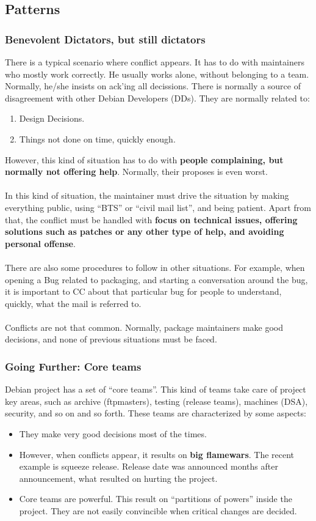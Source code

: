 \documentclass[11pt]{article}
\begin{document}
\subsection{Patterns}
\subsubsection{Benevolent Dictators, but still dictators}
There is a typical scenario where conflict appears. It has to do with maintainers who mostly work correctly. He usually works alone, without belonging to a team. Normally, he/she insists on ack'ing all decissions. There is normally a source of disagreement with other Debian Developers (DDs). They are normally related to:
\begin{enumerate}\itemsep0pt
\item{Design Decisions}.
\item{Things not done on time, quickly enough}.
\end{enumerate}
However, this kind of situation has to do with \textbf{people complaining, but normally not offering help}. Normally, their proposes is even worst.\\
\\
In this kind of situation, the maintainer must drive the situation by making everything public, using  ``BTS'' or ``civil mail list'', and being patient. Apart from that, the conflict must be handled with \textbf{focus on technical issues, offering solutions such as patches or any other type of help, and avoiding personal offense}.\\
\\
There are also some procedures to follow in other situations. For example, when opening a Bug related to packaging, and starting a conversation around the bug, it is important to CC about that particular bug for people to understand, quickly, what the mail is referred to.\\
\\
Conflicts are not that common. Normally, package maintainers make good decisions, and none of previous situations must be faced.

\subsubsection{Going Further: Core teams}
Debian project has a set of ``core teams''. This kind of teams take care of project key areas, such as archive (ftpmasters), testing (release teams), machines (DSA), security, and so on and so forth.
These teams are characterized by some aspects:
\begin{itemize}\itemsep0pt
\item{They make very good decisions most of the times}.
\item{However, when conflicts appear, it results on \textbf{big flamewars}}. The recent example is squeeze release. Release date was announced months after announcement, what resulted on hurting the project.
\item{Core teams are powerful}. This result on ``partitions of powers'' inside the project. They are not easily convincible when critical changes are decided.
\end{itemize}
\end{document}
